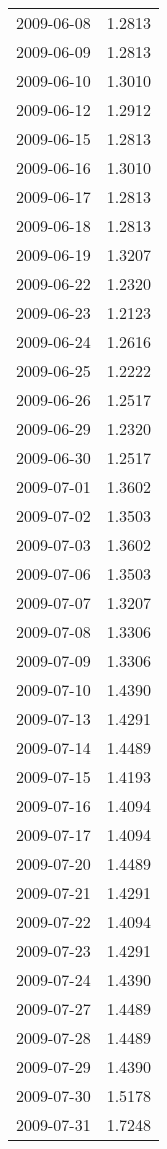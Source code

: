 \begin{tabular}{lr}
2009-06-08 &      1.2813 \\
2009-06-09 &      1.2813 \\
2009-06-10 &      1.3010 \\
2009-06-12 &      1.2912 \\
2009-06-15 &      1.2813 \\
2009-06-16 &      1.3010 \\
2009-06-17 &      1.2813 \\
2009-06-18 &      1.2813 \\
2009-06-19 &      1.3207 \\
2009-06-22 &      1.2320 \\
2009-06-23 &      1.2123 \\
2009-06-24 &      1.2616 \\
2009-06-25 &      1.2222 \\
2009-06-26 &      1.2517 \\
2009-06-29 &      1.2320 \\
2009-06-30 &      1.2517 \\
2009-07-01 &      1.3602 \\
2009-07-02 &      1.3503 \\
2009-07-03 &      1.3602 \\
2009-07-06 &      1.3503 \\
2009-07-07 &      1.3207 \\
2009-07-08 &      1.3306 \\
2009-07-09 &      1.3306 \\
2009-07-10 &      1.4390 \\
2009-07-13 &      1.4291 \\
2009-07-14 &      1.4489 \\
2009-07-15 &      1.4193 \\
2009-07-16 &      1.4094 \\
2009-07-17 &      1.4094 \\
2009-07-20 &      1.4489 \\
2009-07-21 &      1.4291 \\
2009-07-22 &      1.4094 \\
2009-07-23 &      1.4291 \\
2009-07-24 &      1.4390 \\
2009-07-27 &      1.4489 \\
2009-07-28 &      1.4489 \\
2009-07-29 &      1.4390 \\
2009-07-30 &      1.5178 \\
2009-07-31 &      1.7248 \\

\end{tabular}
